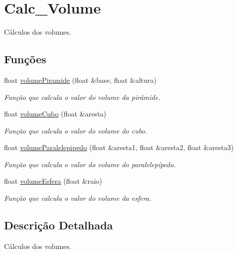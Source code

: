 \hypertarget{group__Calc__Volume}{}\section{Calc\+\_\+\+Volume}
\label{group__Calc__Volume}


Cálculos dos volumes.  


\subsection*{Funções}
\begin{DoxyCompactItemize}
\item 
float \hyperlink{group__Calc__Volume_ga4a36098bad980501fa8e5d0229309098}{volume\+Piramide} (float \&base, float \&altura)
\begin{DoxyCompactList}\small\item\em Função que calcula o valor do volume da pirâmide. \end{DoxyCompactList}\item 
float \hyperlink{group__Calc__Volume_ga43aaef1a010e2ccbe7e5389aa5be3366}{volume\+Cubo} (float \&aresta)
\begin{DoxyCompactList}\small\item\em Função que calcula o valor do volume do cubo. \end{DoxyCompactList}\item 
float \hyperlink{group__Calc__Volume_gadf67b3277ecfcf3e6e225e1f66e30a23}{volume\+Paralelepipedo} (float \&aresta1, float \&aresta2, float \&aresta3)
\begin{DoxyCompactList}\small\item\em Função que calcula o valor do volume do paralelepípedo. \end{DoxyCompactList}\item 
float \hyperlink{group__Calc__Volume_gaf649387c42d43094c7c81e2f26face42}{volume\+Esfera} (float \&raio)
\begin{DoxyCompactList}\small\item\em Função que calcula o valor do volume da esfera. \end{DoxyCompactList}\end{DoxyCompactItemize}


\subsection{Descrição Detalhada}
Cálculos dos volumes. 




